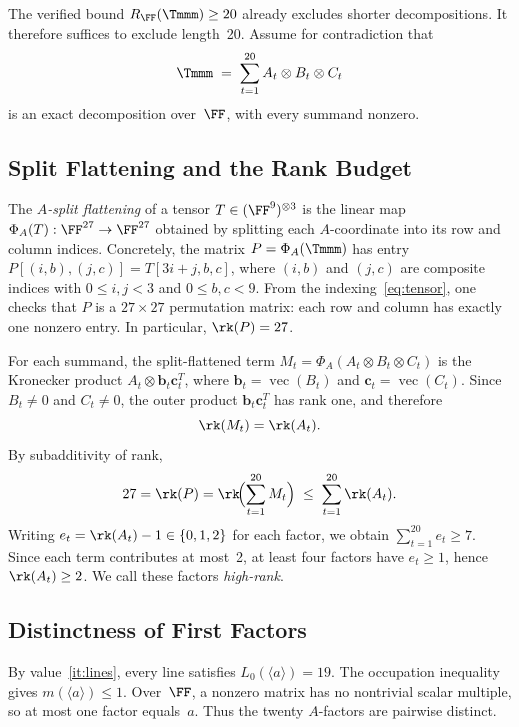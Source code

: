 \documentclass[11pt,a4paper]{article}
\begin{document}
The verified bound $R_{\FF}(\Tmmm)\ge20$ already excludes shorter decompositions. It therefore suffices to exclude length~20. Assume for contradiction that
\begin{equation}\label{eq:decomp}
  \Tmmm \;=\; \sum_{t=1}^{20} A_t\otimes B_t\otimes C_t
\end{equation}
is an exact decomposition over~$\FF$, with every summand nonzero.

\subsection{Split Flattening and the Rank Budget}\label{sec:flattening}

The \emph{$A$-split flattening} of a tensor $T\in(\FF^9)^{\otimes 3}$ is the linear map $\Phi_A(T):\FF^{27}\to\FF^{27}$ obtained by splitting each $A$-coordinate into its row and column indices.  Concretely, the matrix $P=\Phi_A(\Tmmm)$ has entry $P[(i,b),(j,c)]=T[3i+j,b,c]$, where $(i,b)$ and $(j,c)$ are composite indices with $0\le i,j<3$ and $0\le b,c<9$.  From the indexing~\eqref{eq:tensor}, one checks that $P$ is a $27\times27$ permutation matrix: each row and column has exactly one nonzero entry.  In particular, $\rk(P)=27$.

For each summand, the split-flattened term $M_t=\Phi_A(A_t\otimes B_t\otimes C_t)$ is the Kronecker product $A_t\otimes\mathbf{b}_t\mathbf{c}_t^T$, where $\mathbf{b}_t=\operatorname{vec}(B_t)$ and $\mathbf{c}_t=\operatorname{vec}(C_t)$.  Since $B_t\ne 0$ and $C_t\ne 0$, the outer product $\mathbf{b}_t\mathbf{c}_t^T$ has rank one, and therefore
\[
  \rk(M_t) = \rk(A_t).
\]
By subadditivity of rank,
\begin{equation}\label{eq:rksum}
  27 = \rk(P) = \rk\!\Bigl(\sum_{t=1}^{20}M_t\Bigr) \;\le\; \sum_{t=1}^{20}\rk(A_t).
\end{equation}
Writing $e_t=\rk(A_t)-1\in\{0,1,2\}$ for each factor, we obtain $\sum_{t=1}^{20}e_t\ge 7$.  Since each term contributes at most~2, at least four factors have $e_t\ge 1$, hence $\rk(A_t)\ge 2$.  We call these factors \emph{high-rank}.

\subsection{Distinctness of First Factors}

By value~\ref{it:lines}, every line satisfies $L_0(\langle a\rangle)=19$. The occupation inequality gives $m(\langle a\rangle)\le1$. Over~$\FF$, a nonzero matrix has no nontrivial scalar multiple, so at most one factor equals~$a$. Thus the twenty $A$-factors are pairwise distinct.
\end{document}
